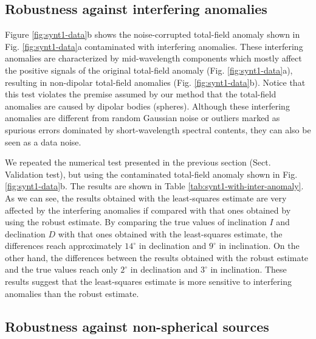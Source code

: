 \documentclass[journal abbreviation, npg]{copernicus}
\begin{document}
\subsection{Robustness against interfering anomalies}

Figure \ref{fig:synt1-data}b shows the noise-corrupted total-field anomaly shown in Fig. \ref{fig:synt1-data}a contaminated with interfering anomalies. These interfering anomalies are characterized by mid-wavelength components which mostly affect the positive signals of the original total-field anomaly (Fig. \ref{fig:synt1-data}a), resulting in non-dipolar total-field anomalies (Fig. \ref{fig:synt1-data}b). Notice that this test violates the premise assumed by our method that the total-field anomalies are caused by dipolar bodies (spheres). Although these interfering anomalies are different from random Gaussian noise or outliers marked as spurious errors dominated by short-wavelength spectral contents, they can also be seen as a data noise.

We repeated the numerical test presented in the previous section (Sect. Validation test), but using the contaminated total-field anomaly shown in Fig. \ref{fig:synt1-data}b. The results are shown in Table \ref{tab:synt1-with-inter-anomaly}. As we can see, the results obtained with the least-squares estimate are very affected by the interfering anomalies if compared with that ones obtained by using the robust estimate. By comparing the true values of inclination $I$ and declination $D$ with that ones obtained with the least-squares estimate, the differences reach approximately $14^{\circ}$ in declination and $9^{\circ}$ in inclination. On the other hand, the differences between the results obtained with the robust estimate and the true values reach only $2^{\circ}$ in declination and $3^{\circ}$ in inclination. These results suggest that the least-squares estimate is more sensitive to interfering anomalies than the robust estimate.

\subsection{Robustness against non-spherical sources}
\end{document}
